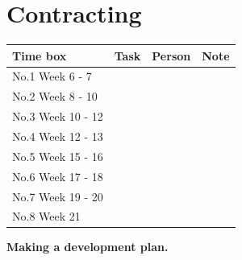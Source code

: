 \section{Contracting}

\begin{table}
	\begin{tabular}{|l|c|c|c|}
		\hline
		Time box			&	Task			&			Person			&			Note \\\hline
		No.1 Week 6 - 7 	& 					&							&				 \\\hline
		No.2 Week 8 - 10	& 					&							&				 \\\hline
		No.3 Week 10 - 12	& 					&							&				 \\\hline
		No.4 Week 12 - 13	& 					&							&				 \\\hline
		No.5 Week 15 - 16	& 					&							&				 \\\hline
		No.6 Week 17 - 18	& 					&							&				 \\\hline
		No.7 Week 19 - 20	& 					&							&				 \\\hline
		No.8 Week 21	 	& 					&							&				 \\\hline
	\end{tabular}
\end{table}

\textbf{\Huge Making a development plan.}